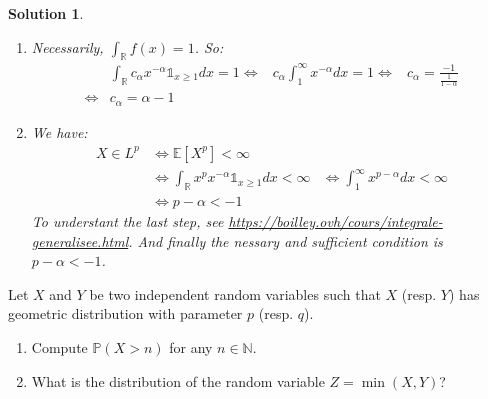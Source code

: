 \documentclass{article}
\newcommand{\esperance}[1]{\mathbb{E}[#1]}
\newcommand{\R}{\mathbb{R}}
\newtheorem{solution}{Solution}
\begin{document}
\begin{solution}
  \begin{enumerate}
    \item Necessarily, $\int_\R f(x) = 1$. So:
          \begin{align*}
                 & \int_\R c_{\alpha} x^{-\alpha} \mathbb{1}_{x \geq 1} dx = 1
            \iff & c_{\alpha} \int_1^\infty x^{-\alpha} dx = 1
            \iff & c_{\alpha} = \frac{-1}{\frac{1}{1-\alpha}}                  \\
            \iff & c_{\alpha} = \alpha - 1
          \end{align*}
    \item We have:
          \begin{align*}
            X \in L^p & \iff \esperance{X^p} < \infty                                  \\
                      & \iff \int_\R x^p x^{-\alpha} \mathbb{1}_{x \geq 1} dx < \infty
                      & \iff \int_1^\infty x^{p-\alpha} dx < \infty                    \\
                      & \iff p - \alpha < -1
          \end{align*}
          To understant the last step, see \url{https://boilley.ovh/cours/integrale-generalisee.html}.
          And finally the nessary and sufficient condition is $p - \alpha < -1$.
  \end{enumerate}
\end{solution}

\begin{Exercise} Let $X$ and $Y$ be two independent random variables such that $X$ (resp. $Y$) has geometric distribution with parameter $p$ (resp. $q$).
  \begin{enumerate}
    \item Compute $\mathbb{P}(X>n)$ for any $n \in \mathbb{N}$.
    \item What is the distribution of the random variable $Z=\min (X, Y)$?
  \end{enumerate}
\end{Exercise}
\end{document}

